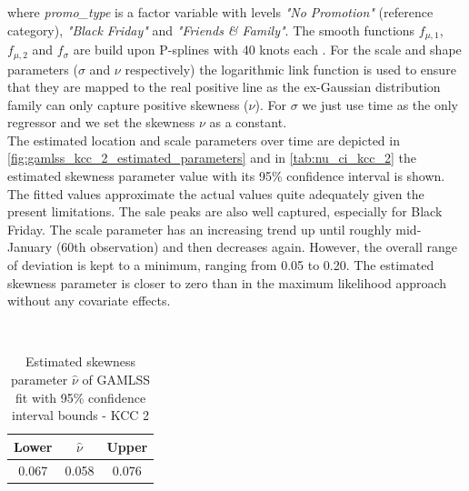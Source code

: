 where \textit{promo\_type} is a factor variable with levels \textit{"No Promotion"} (reference category), \textit{"Black Friday"} and \textit{"Friends \& Family"}. The smooth functions $f_{\mu ,1}$, $f_{\mu ,2}$ and $f_{\sigma}$ are build upon P-splines with 40 knots each \citep{fahrmeir2003regression}. For the scale and shape parameters ($\sigma$ and $\nu$ respectively) the logarithmic link function is used to ensure that they are mapped to the real positive line as the ex-Gaussian distribution family can only capture positive skewness ($\nu$). For $\sigma$ we just use time as the only regressor and we set the skewness $\nu$ as a constant.\\
 The estimated location and scale parameters over time are depicted in \autoref{fig:gamlss_kcc_2_estimated_parameters} and in \autoref{tab:nu_ci_kcc_2} the estimated skewness parameter value with its 95\% confidence interval is shown. The fitted values approximate the actual values quite adequately given the present limitations. The sale peaks are also well captured, especially for Black Friday. The scale parameter has an increasing trend up until roughly mid-January (60th observation) and then decreases again. However, the overall range of deviation is kept to a minimum, ranging from 0.05 to 0.20. The estimated skewness parameter is closer to zero than in the maximum likelihood approach without any covariate effects.
\\


\begin{table}[H]
\setlength\arrayrulewidth{1pt}  
\centering
\begin{adjustbox}{max width=\textwidth}\
\begin{tabular}{c|c|c}
\hline
\rowcolor{white} 
\textbf{Lower} & $\hat{\nu}$ & \textbf{Upper} \\ \hline\hline
0.067        & 0.058           & 0.076        \\ \hline
\end{tabular}
\end{adjustbox}
\caption{Estimated skewness parameter $\hat{\nu}$ of GAMLSS fit with 95\% confidence interval bounds - KCC 2}
\label{tab:nu_ci_kcc_2}
\end{table}


